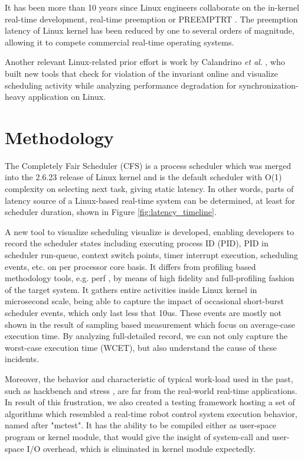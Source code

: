 \documentclass[conference]{IEEEtran}
\begin{document}
It has been more than 10 years since Linux engineers collaborate on the in-kernel real-time development, real-time
preemption or PREEMPT\textunderscore RT \cite{rt-linux}. The preemption latency of Linux kernel has been reduced by
one to several orders of magnitude, allowing it to compete commercial real-time operating systems.

Another relevant Linux-related prior effort is work by Calandrino \textit{et al}. \cite{Lozi:2016:LSD:2901318.2901326},
who built new tools that check for violation of the invariant online and visualize scheduling activity while analyzing
performance degradation for synchronization-heavy application on Linux.

\section{Methodology}

    The Completely Fair Scheduler (CFS) is a process scheduler which was merged into the 2.6.23 release of Linux kernel
    and is the default scheduler with O(1) complexity on selecting next task, giving static latency. In other words, parts
    of latency source of a Linux-based real-time system can be determined, at least for scheduler duration, shown in
    Figure \ref{fig:latency_timeline}.

    A new tool to visualize scheduling visualize is developed, enabling developers to record the scheduler states
    including executing process ID (PID), PID in scheduler run-queue, context switch points, timer interrupt execution,
    scheduling events, etc. on per processor core basis. It differs from profiling based methodology tools, e.g.
    perf \cite{perf}, by means of high fidelity and full-profiling fashion of the target system. It gathers entire
    activities inside Linux kernel in microsecond scale, being able to capture the impact of occasional short-burst
    scheduler events, which only last less that 10us. These events are mostly not shown in the result of sampling based
    measurement which focus on average-case execution time. By analyzing full-detailed record, we can not only
    capture the worst-case execution time (WCET), but also understand the cause of these incidents.

    Moreover, the behavior and characteristic of typical work-load used in the past, such as hackbench and stress \cite{rt-tests},
    are far from the real-world real-time applications. In result of this frustration, we also created a testing framework
    hosting a set of algorithms which resembled a real-time robot control system execution behavior, named after "mctest".
    It has the ability to be compiled either as user-space program or kernel module, that would give the insight of system-call
    and user-space I/O overhead, which is eliminated in kernel module expectedly.
\end{document}
